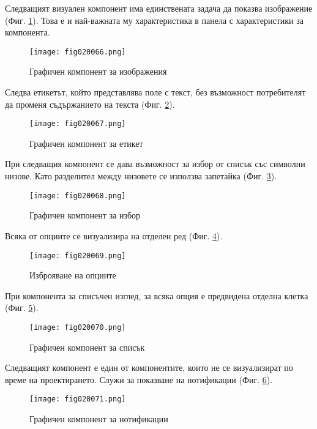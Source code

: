 Следващият визуален компонент има единствената задача да показва изображение (Фиг. \ref{fig020066}). Това е и най-важната му характеристика в панела с характеристики за компонента.

\begin{figure}[H]
  \centering
  \texttt{[image: fig020066.png]}
  \caption{Графичен компонент за изображения}
\label{fig020066}
\end{figure}

Следва етикетът, който представлява поле с текст, без възможност потребителят да променя съдържанието на текста (Фиг. \ref{fig020067}).

\begin{figure}[H]
  \centering
  \texttt{[image: fig020067.png]}
  \caption{Графичен компонент за етикет}
\label{fig020067}
\end{figure}

При следващия компонент се дава възможност за избор от списък със символни низове. Като разделител между низовете се използва запетайка (Фиг. \ref{fig020068}).

\begin{figure}[H]
  \centering
  \texttt{[image: fig020068.png]}
  \caption{Графичен компонент за избор}
\label{fig020068}
\end{figure}

Всяка от опциите се визуализира на отделен ред (Фиг. \ref{fig020069}).

\begin{figure}[H]
  \centering
  \texttt{[image: fig020069.png]}
  \caption{Изброяване на опциите}
\label{fig020069}
\end{figure}

При компонента за списъчен изглед, за всяка опция е предвидена отделна клетка (Фиг. \ref{fig020070}).

\begin{figure}[H]
  \centering
  \texttt{[image: fig020070.png]}
  \caption{Графичен компонент за списък}
\label{fig020070}
\end{figure}

Следващият компонент е един от компонентите, които не се визуализират по време на проектирането. Служи за показване на нотификации (Фиг. \ref{fig020071}).

\begin{figure}[H]
  \centering
  \texttt{[image: fig020071.png]}
  \caption{Графичен компонент за нотификации}
\label{fig020071}
\end{figure}

